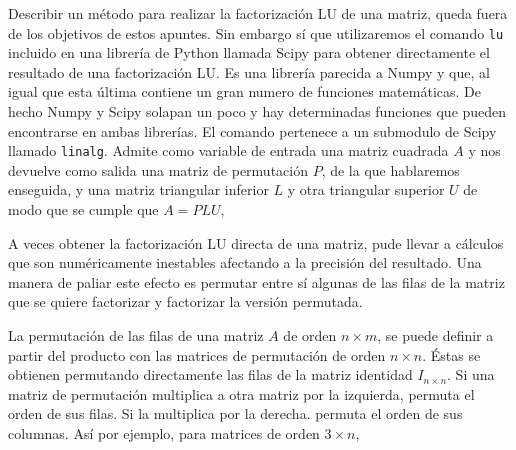 \begin{paracol}{2}
Describir un método para realizar la factorización LU de una matriz, queda fuera de los objetivos de estos apuntes. Sin embargo sí que utilizaremos el comando \texttt{lu} incluido en una librería de Python llamada Scipy para obtener directamente el resultado de una factorización LU. Es una librería parecida a Numpy y que, al igual que esta última contiene un gran numero de funciones matemáticas. De hecho Numpy y Scipy solapan un poco y hay determinadas funciones que pueden encontrarse en ambas librerías. El comando pertenece a un submodulo de Scipy llamado \texttt{linalg}. Admite como variable de entrada una matriz cuadrada $A$ y nos devuelve como salida una matriz de permutación $P$, de la que hablaremos enseguida, y una matriz triangular inferior $L$ y otra triangular superior $U$ de modo que se cumple que $A =PLU$,

A veces obtener la factorización LU directa de una matriz, pude llevar a cálculos que son numéricamente inestables afectando a la precisión del resultado. Una manera de paliar este efecto es permutar entre sí algunas de las filas de la matriz que se quiere factorizar y factorizar la versión permutada.

La permutación de las filas de una matriz $A$ de orden $n\times m$, se puede definir a partir del producto con las matrices de permutación de orden $n \times n$. Éstas se obtienen permutando directamente las filas de la matriz identidad $I_{n \times n}$. Si una matriz de permutación multiplica a otra matriz por la izquierda, permuta el orden de sus filas. Si la multiplica por la derecha. permuta el orden de sus columnas. Así por ejemplo, para matrices de orden $3 \times n$,
\end{paracol}
